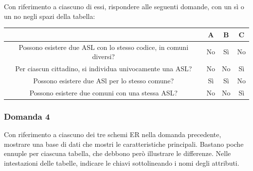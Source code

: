 \documentclass{article}
\numberwithin{equation}{subsection}
\begin{document}
Con riferimento a ciascuno di essi, rispondere alle seguenti domande, con un sì o un no negli spazi
della tabella:

\begin{center}
    \begin{tabular}{|c|c|c|c|}
        \hline
        &A&B&C\\
        \hline
        Possono esistere due ASL con lo stesso codice, in comuni diversi?&No&Sì&No\\
        \hline
        Per ciascun cittadino, si individua univocamente una ASL?&No&No&Sì\\
        \hline
        Possono esistere due ASl per lo stesso comune?&Sì&Sì&No\\
        \hline
        Possono esistere due comuni con una stessa ASL?& No&No&Sì\\
        \hline        
    \end{tabular}
\end{center}

\subsubsection*{Domanda 4}

Con riferimento a ciascuno dei tre schemi ER nella domanda precedente, mostrare
una base di dati che mostri le caratteristiche principali. Bastano poche ennuple per ciascuna tabella,
che debbono però illustrare le differenze. Nelle intestazioni delle tabelle, indicare le chiavi sottolineando
i nomi degli attributi. 
\end{document}
